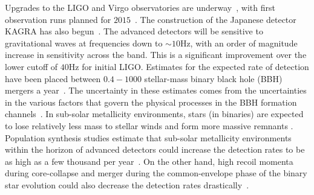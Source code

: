 

Upgrades to the LIGO and Virgo observatories are
underway~\cite{Harry:2010zz,aVIRGO}, with first observation runs planned for
$2015$~\cite{Aasi:2013wya}. The construction of the Japanese detector KAGRA 
has also begun~\cite{Somiya:2011np}. The advanced detectors will be
sensitive to gravitational waves at frequencies down to 
$\sim 10$Hz, with an order of magnitude increase in sensitivity across the
band. This is a significant improvement over the lower cutoff of $40$Hz
for initial LIGO. Estimates for the expected rate of detection have
been placed between $0.4 - 1000$ stellar-mass binary black hole (BBH)
mergers a year~\cite{LSCCBCRates2010}. 
The uncertainty in these estimates comes from the uncertainties in the various
factors that govern the physical processes in the BBH formation 
channels~\cite{1973NInfo..27...86T,1973NInfo..27...70T}. 
In sub-solar metallicity environments, stars (in binaries) are expected to 
lose relatively less mass to stellar winds and form more massive remnants 
\cite{Webbink:1984ti,Kowalska:2012bb,Fryer:2011cx}. 
Population synthesis studies estimate that sub-solar metallicity environments
within the horizon of advanced detectors could increase the detection rates 
to be as high
as a few thousand per year~\cite{Dominik:2012kk,Belczynski:2012cx}. 
On the other hand, high recoil momenta during core-collapse and 
merger during the common-envelope phase of the binary star evolution
could also decrease the detection 
rates drastically~\cite{Fryer:2011cx,Dominik:2012kk}. 


